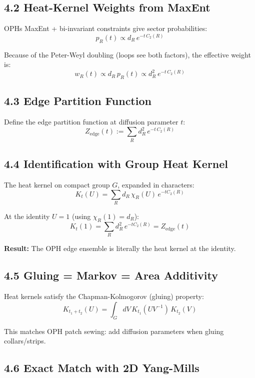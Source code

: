 \subsection{4.2 Heat-Kernel Weights from MaxEnt}\label{42-heat-kernel-weights-from-maxent}

OPH\textquotesingle s MaxEnt + bi-invariant constraints give sector probabilities: \[p_R(t) \propto d_R \, e^{-t \, C_2(R)}\]

Because of the Peter-Weyl doubling (loops see both factors), the effective weight is: \[w_R(t) \propto d_R \, p_R(t) \propto d_R^2 \, e^{-t \, C_2(R)}\]

\subsection{4.3 Edge Partition Function}\label{43-edge-partition-function}

Define the edge partition function at diffusion parameter \(t\): \[Z_{\text{edge}}(t) := \sum_R d_R^2 \, e^{-t \, C_2(R)}\]

\subsection{4.4 Identification with Group Heat Kernel}\label{44-identification-with-group-heat-kernel}

The heat kernel on compact group \(G\), expanded in characters: \[K_t(U) = \sum_R d_R \, \chi_R(U) \, e^{-t C_2(R)}\]

At the identity \(U = 1\) (using \(\chi_R(1) = d_R\)): \[K_t(1) = \sum_R d_R^2 \, e^{-t C_2(R)} = Z_{\text{edge}}(t)\]

\textbf{Result:} The OPH edge ensemble is literally the heat kernel at the identity.

\subsection{4.5 Gluing = Markov = Area Additivity}\label{45-gluing--markov--area-additivity}

Heat kernels satisfy the Chapman-Kolmogorov (gluing) property: \[K_{t_1 + t_2}(U) = \int_G dV \, K_{t_1}(UV^{-1}) \, K_{t_2}(V)\]

This matches OPH patch sewing: add diffusion parameters when gluing collars/strips.

\subsection{4.6 Exact Match with 2D Yang-Mills}\label{46-exact-match-with-2d-yang-mills}

